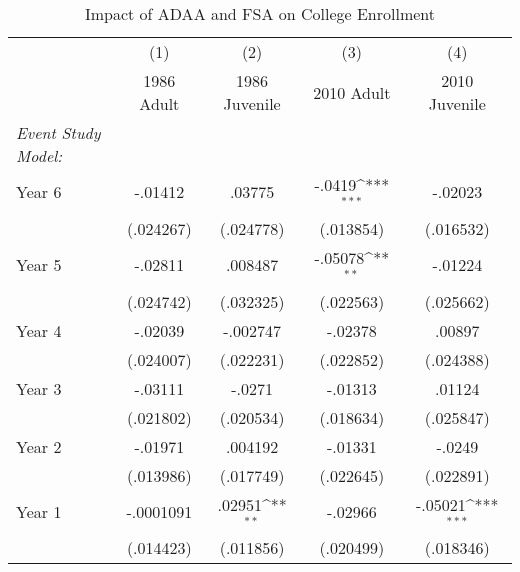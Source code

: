 \begin{table}[htbp]\centering
\def\sym#1{\ifmmode^{#1}\else\(^{#1}\)\fi}
\caption{Impact of ADAA and FSA on College Enrollment}
\begin{tabular}{l*{4}{c}}
\hline\hline
                    &\multicolumn{1}{c}{(1)}&\multicolumn{1}{c}{(2)}&\multicolumn{1}{c}{(3)}&\multicolumn{1}{c}{(4)}\\
                    &\multicolumn{1}{c}{1986 Adult}&\multicolumn{1}{c}{1986 Juvenile}&\multicolumn{1}{c}{2010 Adult}&\multicolumn{1}{c}{2010 Juvenile}\\
\hline
\emph{Event Study Model:}&                     &                     &                     &                     \\
[1em]
Year 6              &     -.01412         &      .03775         &      -.0419\sym{***}&     -.02023         \\
                    &   (.024267)         &   (.024778)         &   (.013854)         &   (.016532)         \\
[1em]
Year 5              &     -.02811         &     .008487         &     -.05078\sym{**} &     -.01224         \\
                    &   (.024742)         &   (.032325)         &   (.022563)         &   (.025662)         \\
[1em]
Year 4              &     -.02039         &    -.002747         &     -.02378         &      .00897         \\
                    &   (.024007)         &   (.022231)         &   (.022852)         &   (.024388)         \\
[1em]
Year 3              &     -.03111         &      -.0271         &     -.01313         &      .01124         \\
                    &   (.021802)         &   (.020534)         &   (.018634)         &   (.025847)         \\
[1em]
Year 2              &     -.01971         &     .004192         &     -.01331         &      -.0249         \\
                    &   (.013986)         &   (.017749)         &   (.022645)         &   (.022891)         \\
[1em]
Year 1              &   -.0001091         &      .02951\sym{**} &     -.02966         &     -.05021\sym{***}\\
                    &   (.014423)         &   (.011856)         &   (.020499)         &   (.018346)         \\

\end{tabular}
\end{table}
